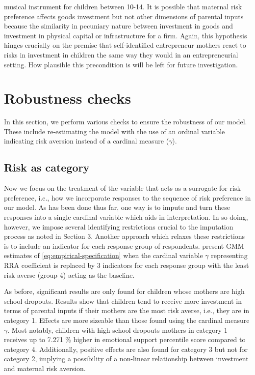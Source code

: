 \documentclass[emulatestandardclasses, 10pt, abstract = true]{scrartcl}
\begin{document}
musical instrument for children between 10-14. It is possible that maternal risk preference affects goods investment but not other dimensions of parental inputs because the similarity in pecuniary nature between investment in goods and investment in physical capital or infrastructure for a firm. Again, this hypothesis hinges crucially on the premise that self-identified entrepreneur mothers react to risks in investment in children the same way they would in an entrepreneurial setting. How plausible this precondition is will be left for future investigation.    




\section{Robustness checks}
In this section, we perform various checks to ensure the robustness of our model. These include re-estimating the model with the use of an ordinal variable indicating risk aversion instead of a cardinal measure ($\gamma$). 

\subsection{Risk as category}
Now we focus on the treatment of the variable that acts as a surrogate for risk preference, i.e., how we incorporate responses to the sequence of risk preference in our model. As has been done thus far, one way is to impute and turn these responses into a single cardinal variable which aids in interpretation. In so doing, however, we impose several identifying restrictions crucial to the imputation process as noted in Section 3. Another approach which relaxes these restrictions is to include an indicator for each response group of respondents.  present GMM estimates of \eqref{eq:empirical-specification} when the cardinal variable $\gamma$ representing RRA coefficient is replaced by 3 indicators for each response group with the least risk averse (group 4) acting as the baseline.


\alert{As before, significant results are only found for children whose mothers are high school dropouts. Results show that children tend to receive more investment in terms of parental inputs if their mothers are the most risk averse, i.e., they are in category 1. Effects are more sizeable than those found using the cardinal measure $\gamma$. Most notably, children with high school dropouts mothers in category 1 receives up to 7.271 \% higher in emotional support percentile score compared to category 4. Additionally, positive effects are also found for category 3 but not for category 2, implying a possibility of a non-linear relationship between investment and maternal risk aversion.
}
\end{document}

